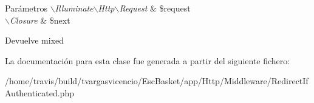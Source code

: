 \begin{DoxyParams}{\-Parámetros}
{\em $\backslash$\-Illuminate$\backslash$\-Http$\backslash$\-Request} & \$request \\
\hline
{\em $\backslash$\-Closure} & \$next \\
\hline
\end{DoxyParams}
\begin{DoxyReturn}{\-Devuelve}
mixed 
\end{DoxyReturn}


\-La documentación para esta clase fue generada a partir del siguiente fichero\-:\begin{DoxyCompactItemize}
\item 
/home/travis/build/tvargasvicencio/\-Esc\-Basket/app/\-Http/\-Middleware/\-Redirect\-If\-Authenticated.\-php\end{DoxyCompactItemize}
